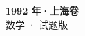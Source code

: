 \documentclass[zihao=-4, a4paper]{ctexart}
\begin{document}
\begin{center}
  {\Large\bfseries 1992 年·上海卷}\\[4pt]
  {\large 数学 · 试题版}
\end{center}
\medskip
{}

\end{document}
